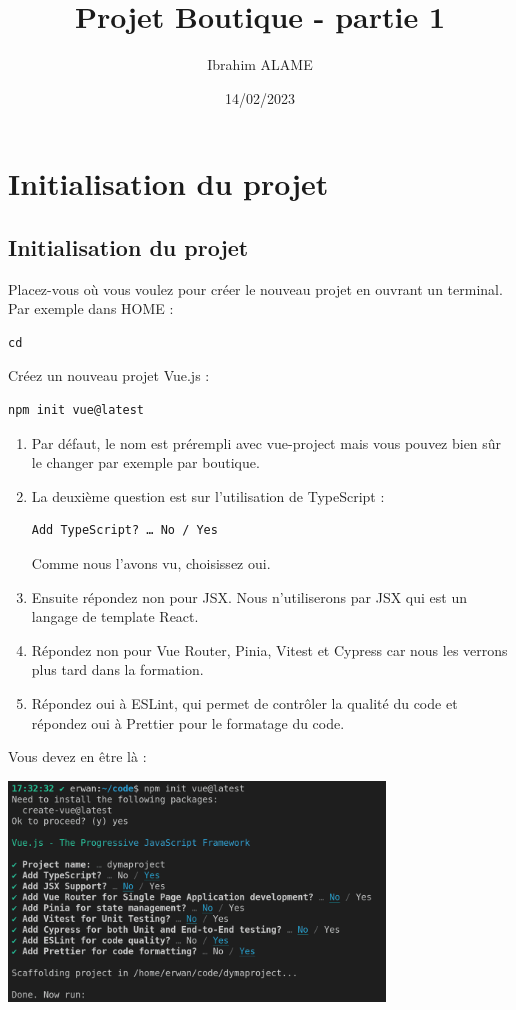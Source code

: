 \documentclass{article}
\title{Projet Boutique - partie 1}
\author{Ibrahim ALAME}
\date{14/02/2023}
\begin{document}
\maketitle

\section{Initialisation du projet}
\subsection{Initialisation du projet}
Placez-vous où vous voulez pour créer le nouveau projet en ouvrant un terminal. Par exemple dans HOME :
\begin{verbatim}
cd
\end{verbatim}
Créez un nouveau projet {\color{monOrange}Vue.js} :
\begin{verbatim}
npm init vue@latest
\end{verbatim}
\begin{enumerate}
\item Par défaut, le nom est prérempli avec {\color{monOrange}vue-project} mais vous pouvez bien sûr le changer par exemple par {\color{monOrange}boutique}.
\item  La deuxième question est sur l'utilisation de {\color{monOrange}TypeScript} :
\begin{verbatim}
Add TypeScript? … No / Yes
\end{verbatim}
Comme nous l'avons vu, choisissez oui.
\item Ensuite répondez non pour JSX. Nous n'utiliserons par JSX qui est un langage de {\color{monOrange}template React}.
\item Répondez non pour {\color{monOrange}Vue Router, Pinia, Vitest} et {\color{monOrange}Cypress} car nous les verrons plus tard dans la formation.
\item Répondez oui à {\color{monOrange}ESLint}, qui permet de contrôler la qualité du code et répondez oui à {\color{monOrange}Prettier} pour le formatage du code.
\end{enumerate}

Vous devez en être là :
\begin{center}
\includegraphics[width=10cm]{images/image04.png}
\end{center}
\end{document}
